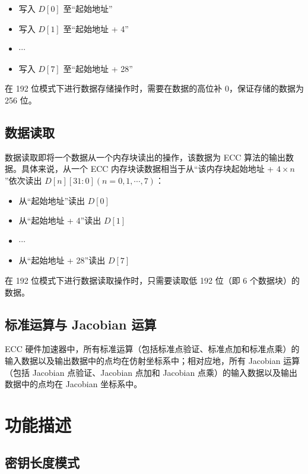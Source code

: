 \documentclass[main\_\_CN.tex]{subfiles}
\begin{document}
\begin{itemize}
    \item 写入 $D[0]$ 至“起始地址”
    \item 写入 $D[1]$ 至“起始地址 + 4”
    \item $\cdots$
    \item 写入 $D[7]$ 至“起始地址 + 28”
\end{itemize}

\begin{tiplisting}
在 192 位模式下进行数据存储操作时，需要在数据的高位补 0，保证存储的数据为 256 位。
\end{tiplisting}

\subsection{数据读取}

数据读取即将一个数据从一个内存块读出的操作，该数据为 ECC 算法的输出数据。具体来说，从一个 ECC 内存块读数据相当于从“该内存块起始地址 + $4 \times n$”依次读出 $D[n][31:0] (n=0, 1, \cdots, 7)$：
\begin{itemize}
    \item 从“起始地址”读出 $D[0]$
    \item 从“起始地址 + 4”读出 $D[1]$
    \item $\cdots$
    \item 从“起始地址 + 28”读出 $D[7]$
\end{itemize}

\begin{tiplisting}
在 192 位模式下进行数据读取操作时，只需要读取低 192 位（即 6 个数据块）的数据。
\end{tiplisting}


\subsection{标准运算与 Jacobian 运算}

\chipname{} ECC 硬件加速器中，所有标准运算（包括标准点验证、标准点加和标准点乘）的输入数据以及输出数据中的点均在仿射坐标系中；相对应地，所有 Jacobian 运算（包括 Jacobian 点验证、Jacobian 点加和 Jacobian 点乘）的输入数据以及输出数据中的点均在 Jacobian 坐标系中。

\section{功能描述}
\label{sec:ecc-mode-config}
\subsection{密钥长度模式}
\end{document}
